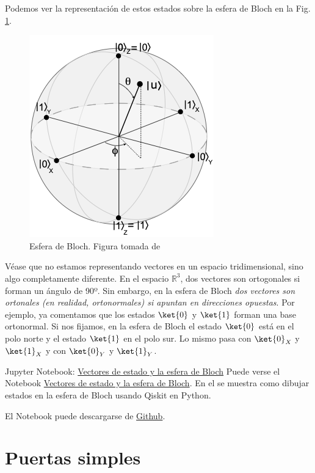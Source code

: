 \documentclass[a4paper,11pt]{book} %
\numberwithin{equation}{chapter}
\begin{document}
Podemos ver la representación de estos estados sobre la esfera de Bloch en la Fig. \ref{Fig_qubit_BlochSphere}. 




	\begin{figure}[H]
	\centering 
	\includegraphics[width=0.3\linewidth]{Figuras/Fig_qubit_BlochSphere.png}
	\caption{Esfera de Bloch. Figura tomada de \cite{bib_Curso-JMas}}
	\label{Fig_qubit_BlochSphere}
	\end{figure}
	
	Véase que no estamos representando vectores en un espacio tridimensional, sino algo completamente diferente. En el espacio $\mathbb{R}^3$, dos vectores son ortogonales si forman un ángulo de 90º. Sin embargo, en la esfera de Bloch \textit{dos vectores son ortonales (en realidad, ortonormales) si apuntan en direcciones opuestas}. Por ejemplo, ya comentamos que los estados $\ket{0}$ y $\ket{1}$ forman una base ortonormal. Si nos fijamos, en la esfera de Bloch el estado $\ket{0}$ está en el polo norte y el estado $\ket{1}$ en el polo sur. Lo mismo pasa con $\ket{0}_X$ y $\ket{1}_X$ y con $\ket{0}_Y$ y $\ket{1}_Y$.

        
    \begin{mybox_orange}{Jupyter Notebook: \href{https://www.scbi.uma.es/web/wp-content/uploads/Jupyterbook/CICC_UMA/Notebooks/html/docs/Part_01/Chapter_02-Estados_y_Esfera_de_Bloch_myst.html}{Vectores de estado y la esfera de Bloch}}
    Puede verse el Notebook  \href{https://www.scbi.uma.es/web/wp-content/uploads/Jupyterbook/CICC_UMA/Notebooks/html/docs/Part_01/Chapter_02-Estados_y_Esfera_de_Bloch_myst.html}{Vectores de estado y la esfera de Bloch}. En el se muestra como dibujar estados en la esfera de Bloch usando Qiskit en Python.
    
    El Notebook puede descargarse de \href{https://github.com/davidcb98/CICC_UMA/blob/master/Notebooks/Part_01/Chapter_02-Estados_y_Esfera_de_Bloch.ipynb}{Github}.
    \end{mybox_orange}




\chapter{Puertas simples}
\end{document}
